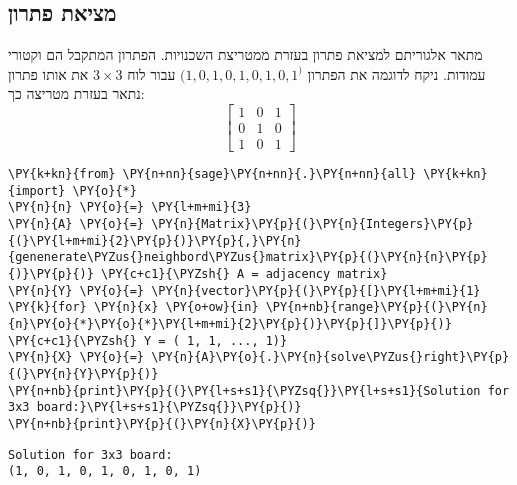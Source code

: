     \newpage
    \hypertarget{solver-based-on-adjacency-matrix}{%
\subsection{מציאת פתרון}\label{solver-based-on-adjacency-matrix}}
מתאר אלגוריתם למציאת פתרון בעזרת ממטריצת השכנויות.
הפתרון המתקבל הם וקטורי עמודות.
ניקח לדוגמה את הפתרון
$(1, 0, 1, 0, 1, 0, 1, 0, 1^)$
עבור לוח 
$3 \times 3$
את אותו פתרון נתאר בעזרת מטריצה כך:
\[
    \begin{bmatrix}
        1 & 0 & 1 \\
        0 & 1 & 0 \\
        1 & 0 & 1
    \end{bmatrix}
\]
\begin{english}
    \begin{tcolorbox}[breakable, size=fbox, boxrule=1pt, pad at break*=1mm,colback=cellbackground, colframe=cellborder]
\begin{Verbatim}[commandchars=\\\{\}]
\PY{k+kn}{from} \PY{n+nn}{sage}\PY{n+nn}{.}\PY{n+nn}{all} \PY{k+kn}{import} \PY{o}{*}
\PY{n}{n} \PY{o}{=} \PY{l+m+mi}{3}
\PY{n}{A} \PY{o}{=} \PY{n}{Matrix}\PY{p}{(}\PY{n}{Integers}\PY{p}{(}\PY{l+m+mi}{2}\PY{p}{)}\PY{p}{,}\PY{n}{genenerate\PYZus{}neighbord\PYZus{}matrix}\PY{p}{(}\PY{n}{n}\PY{p}{)}\PY{p}{)} \PY{c+c1}{\PYZsh{} A = adjacency matrix}
\PY{n}{Y} \PY{o}{=} \PY{n}{vector}\PY{p}{(}\PY{p}{[}\PY{l+m+mi}{1} \PY{k}{for} \PY{n}{x} \PY{o+ow}{in} \PY{n+nb}{range}\PY{p}{(}\PY{n}{n}\PY{o}{*}\PY{o}{*}\PY{l+m+mi}{2}\PY{p}{)}\PY{p}{]}\PY{p}{)} \PY{c+c1}{\PYZsh{} Y = ( 1, 1, ..., 1)}
\PY{n}{X} \PY{o}{=} \PY{n}{A}\PY{o}{.}\PY{n}{solve\PYZus{}right}\PY{p}{(}\PY{n}{Y}\PY{p}{)}
\PY{n+nb}{print}\PY{p}{(}\PY{l+s+s1}{\PYZsq{}}\PY{l+s+s1}{Solution for 3x3 board:}\PY{l+s+s1}{\PYZsq{}}\PY{p}{)}
\PY{n+nb}{print}\PY{p}{(}\PY{n}{X}\PY{p}{)}
\end{Verbatim}
\end{tcolorbox}

    \begin{Verbatim}[commandchars=\\\{\}]
Solution for 3x3 board:
(1, 0, 1, 0, 1, 0, 1, 0, 1)
    \end{Verbatim}
\end{english}

